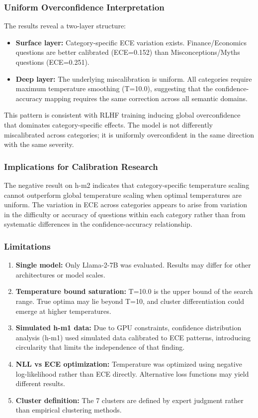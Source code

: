 
\subsubsection{Uniform Overconfidence Interpretation}

The results reveal a two-layer structure:

\begin{itemize}
\item \textbf{Surface layer:} Category-specific ECE variation exists. Finance/Economics questions are better calibrated (ECE=0.152) than Misconceptions/Myths questions (ECE=0.251).
\item \textbf{Deep layer:} The underlying miscalibration is uniform. All categories require maximum temperature smoothing (T=10.0), suggesting that the confidence-accuracy mapping requires the same correction across all semantic domains.
\end{itemize}

This pattern is consistent with RLHF training inducing global overconfidence that dominates category-specific effects. The model is not differently miscalibrated across categories; it is uniformly overconfident in the same direction with the same severity.

\subsubsection{Implications for Calibration Research}

The negative result on h-m2 indicates that category-specific temperature scaling cannot outperform global temperature scaling when optimal temperatures are uniform. The variation in ECE across categories appears to arise from variation in the difficulty or accuracy of questions within each category rather than from systematic differences in the confidence-accuracy relationship.

\subsubsection{Limitations}

\begin{enumerate}
\item \textbf{Single model:} Only Llama-2-7B was evaluated. Results may differ for other architectures or model scales.
\item \textbf{Temperature bound saturation:} T=10.0 is the upper bound of the search range. True optima may lie beyond T=10, and cluster differentiation could emerge at higher temperatures.
\item \textbf{Simulated h-m1 data:} Due to GPU constraints, confidence distribution analysis (h-m1) used simulated data calibrated to ECE patterns, introducing circularity that limits the independence of that finding.
\item \textbf{NLL vs ECE optimization:} Temperature was optimized using negative log-likelihood rather than ECE directly. Alternative loss functions may yield different results.
\item \textbf{Cluster definition:} The 7 clusters are defined by expert judgment rather than empirical clustering methods.
\end{enumerate}
